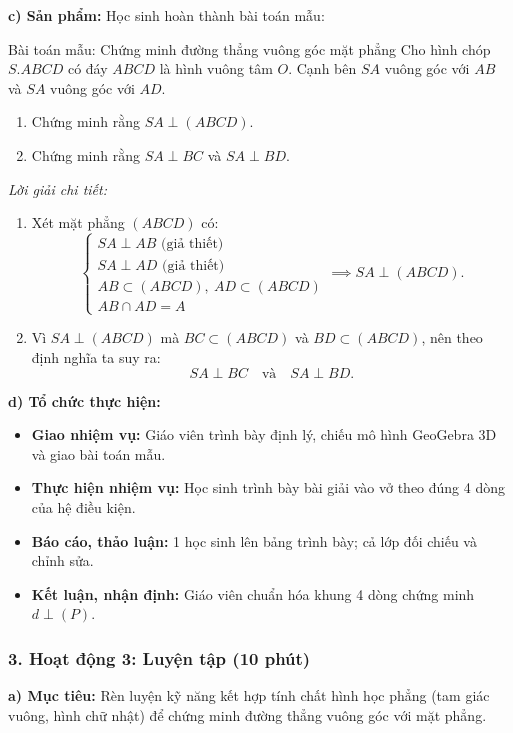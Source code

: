 \documentclass[12pt, a4paper]{article}
\begin{document}
\noindent \textbf{c) Sản phẩm:}
Học sinh hoàn thành bài toán mẫu:
\begin{pedabox}{Bài toán mẫu: Chứng minh đường thẳng vuông góc mặt phẳng}
Cho hình chóp $S.ABCD$ có đáy $ABCD$ là hình vuông tâm $O$. Cạnh bên $SA$ vuông góc với $AB$ và $SA$ vuông góc với $AD$.
\begin{enumerate}[leftmargin=0.6cm]
    \item Chứng minh rằng $SA \perp (ABCD)$.
    \item Chứng minh rằng $SA \perp BC$ và $SA \perp BD$.
\end{enumerate}
\end{pedabox}
\textit{Lời giải chi tiết:}
\begin{enumerate}[leftmargin=0.6cm]
    \item Xét mặt phẳng $(ABCD)$ có:
    $$\begin{cases} SA \perp AB\text{ (giả thiết)} \\ SA \perp AD\text{ (giả thiết)} \\ AB \subset (ABCD), \ AD \subset (ABCD) \\ AB \cap AD = A \end{cases} \implies SA \perp (ABCD).$$
    \item Vì $SA \perp (ABCD)$ mà $BC \subset (ABCD)$ và $BD \subset (ABCD)$, nên theo định nghĩa ta suy ra:
    $$SA \perp BC \quad \text{và} \quad SA \perp BD.$$
\end{enumerate}

\noindent \textbf{d) Tổ chức thực hiện:}
\begin{itemize}[leftmargin=0.6cm]
    \item \textbf{Giao nhiệm vụ:} Giáo viên trình bày định lý, chiếu mô hình GeoGebra 3D và giao bài toán mẫu.
    \item \textbf{Thực hiện nhiệm vụ:} Học sinh trình bày bài giải vào vở theo đúng 4 dòng của hệ điều kiện.
    \item \textbf{Báo cáo, thảo luận:} 1 học sinh lên bảng trình bày; cả lớp đối chiếu và chỉnh sửa.
    \item \textbf{Kết luận, nhận định:} Giáo viên chuẩn hóa khung 4 dòng chứng minh $d \perp (P)$.
\end{itemize}

\subsubsection*{3. Hoạt động 3: Luyện tập (10 phút)}

\noindent \textbf{a) Mục tiêu:}
Rèn luyện kỹ năng kết hợp tính chất hình học phẳng (tam giác vuông, hình chữ nhật) để chứng minh đường thẳng vuông góc với mặt phẳng.
\end{document}
